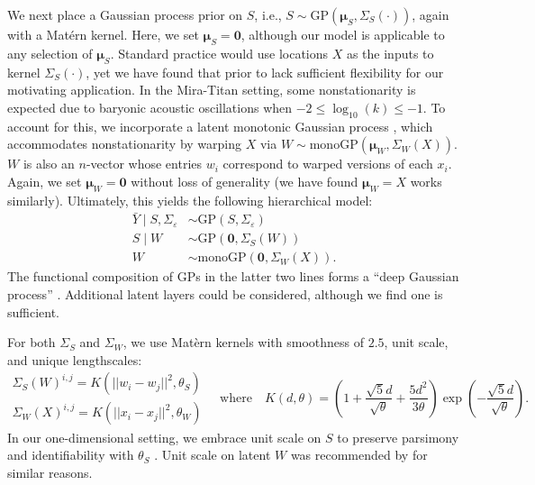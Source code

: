 \documentclass[11pt]{article}
\begin{document}
We next place a Gaussian process prior on $S$, i.e.,
$S\sim \mathrm{GP}\left(\boldsymbol{\mu}_S, \Sigma_S(\cdot)\right)$, again with a 
Mat\'ern kernel. Here, we set $\boldsymbol{\mu}_S=\mathbf{0}$, although our model
is applicable to any selection of $\boldsymbol{\mu}_S$. Standard practice would 
use locations $X$ as the inputs to kernel $\Sigma_S(\cdot)$, yet we have found that 
prior to lack sufficient flexibility for our motivating
application.  In the Mira-Titan setting, some nonstationarity is expected due to 
baryonic acoustic oscillations when $-2 \leq \log_{10}(k) \leq -1$. To account 
for this, we incorporate a latent monotonic Gaussian process \citep[monoGP;][]{barnett2025monotonic},
which accommodates nonstationarity by warping $X$ via 
$W \sim \mathrm{monoGP}\left(\boldsymbol{\mu}_W, \Sigma_W(X)\right)$.
$W$ is also an $n$-vector whose entries $w_i$ correspond to warped versions of each $x_i$.
Again, we set $\boldsymbol{\mu}_W = \mathbf{0}$ without loss of generality (we have
found $\boldsymbol{\mu}_W = X$ works similarly).
Ultimately, this yields the following hierarchical model:
\begin{equation}\label{eq:dgphm}
\begin{aligned}
\bar{Y}\mid S,\Sigma_\varepsilon &\sim \mathrm{GP}(S,\Sigma_\varepsilon) \\
S\mid W &\sim \mathrm{GP}\left(\mathbf{0}, \Sigma_S(W)\right) \\
W &\sim \mathrm{monoGP}\left(\mathbf{0}, \Sigma_W(X)\right).
\end{aligned}
\end{equation}
The functional composition of GPs in the latter two lines forms a ``deep Gaussian process'' 
\citep{damianou2013deep,dunlop2018deep}. Additional latent layers could be considered, 
although we find one is sufficient.

For both $\Sigma_S$ and $\Sigma_W$, we use Mat\`ern kernels with smoothness of $2.5$,
unit scale, and unique lengthscales:
\begin{equation}\label{eq:cov}
\begin{array}{l}
\Sigma_S(W)^{i,j} = K\left(||w_i - w_j||^2, \theta_S\right) \\[7pt]
\Sigma_W(X)^{i,j} = K\left(||x_i - x_j||^2, \theta_W\right)
\end{array}
\quad\textrm{where}\quad
K(d, \theta) = \left( 1 + \frac{\sqrt{5}d}{\sqrt{\theta}} + 
  \frac{5d^2}{3\theta}\right) \exp\left(-\frac{\sqrt{5}d}{\sqrt{\theta}}\right).
\end{equation}
In our one-dimensional setting, we embrace unit scale on $S$ to preserve parsimony 
and identifiability with $\theta_S$ \citep{zhang2004inconsistent}.
Unit scale on latent $W$ was recommended by \citet{sauer2023active} for similar reasons.
\end{document}
